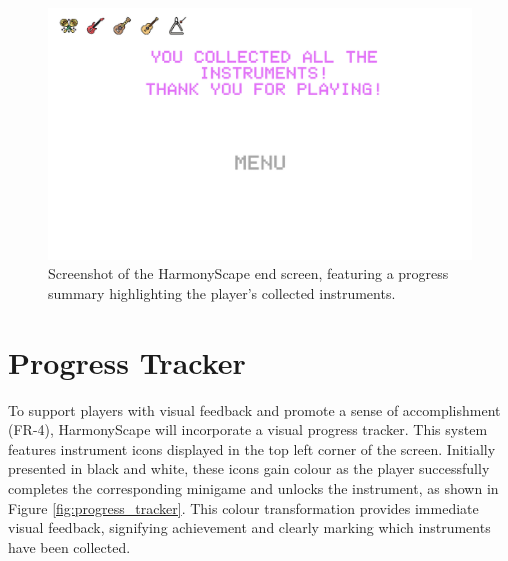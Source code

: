 \documentclass{l4proj}
\begin{document}
\begin{figure}[h]
 \centering
 \includegraphics[width=0.7\linewidth]{dissertation/images/end_screen.png} 
 \caption{Screenshot of the HarmonyScape end screen, featuring a progress summary highlighting the player's collected instruments.}
 \label{fig:end_screen} 
\end{figure}

\section{Progress Tracker}
To support players with visual feedback and promote a sense of accomplishment (FR-4), HarmonyScape will incorporate a visual progress tracker. This system features instrument icons displayed in the top left corner of the screen. Initially presented in black and white, these icons gain colour as the player successfully completes the corresponding minigame and unlocks the instrument, as shown in Figure \ref{fig:progress_tracker}. This colour transformation provides immediate visual feedback, signifying achievement and clearly marking which instruments have been collected.
\end{document}
